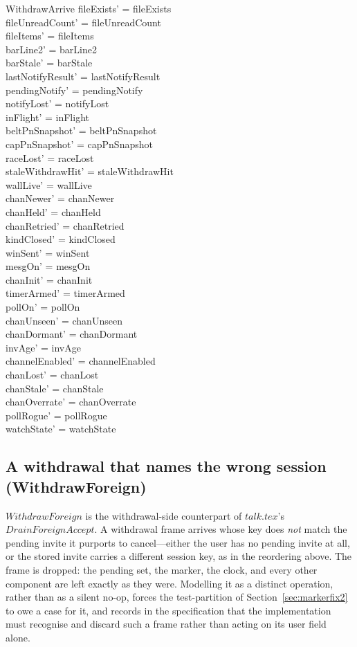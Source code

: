 \documentclass[a4paper,10pt,fleqn]{article}
\begin{document}
\begin{schema}{WithdrawArrive}
  fileExists' = fileExists \\
  fileUnreadCount' = fileUnreadCount \\
  fileItems' = fileItems \\
  barLine2' = barLine2 \\
  barStale' = barStale \\
  lastNotifyResult' = lastNotifyResult \\
  pendingNotify' = pendingNotify \\
  notifyLost' = notifyLost \\
  inFlight' = inFlight \\
  beltPnSnapshot' = beltPnSnapshot \\
  capPnSnapshot' = capPnSnapshot \\
  raceLost' = raceLost \\
  staleWithdrawHit' = staleWithdrawHit \\
  wallLive' = wallLive \\
  chanNewer' = chanNewer \\
  chanHeld' = chanHeld \\
  chanRetried' = chanRetried \\
  kindClosed' = kindClosed \\
  winSent' = winSent \\
  mesgOn' = mesgOn \\
  chanInit' = chanInit \\
  timerArmed' = timerArmed \\
  pollOn' = pollOn \\
  chanUnseen' = chanUnseen \\
  chanDormant' = chanDormant \\
  invAge' = invAge \\
  channelEnabled' = channelEnabled \\
  chanLost' = chanLost \\
  chanStale' = chanStale \\
  chanOverrate' = chanOverrate \\
  pollRogue' = pollRogue \\
  watchState' = watchState
\end{schema}

\subsection{A withdrawal that names the wrong session (WithdrawForeign)}

$WithdrawForeign$ is the withdrawal-side counterpart of $talk.tex$'s
$DrainForeignAccept$.  A withdrawal frame arrives whose key does \emph{not}
match the pending invite it purports to cancel---either the user has no
pending invite at all, or the stored invite carries a different session key,
as in the reordering above.  The frame is dropped: the pending set, the
marker, the clock, and every other component are left exactly as they were.
Modelling it as a distinct operation, rather than as a silent no-op, forces
the test-partition of Section~\ref{sec:markerfix2} to owe a case for it, and
records in the specification that the implementation must recognise and
discard such a frame rather than acting on its user field alone.
\end{document}
